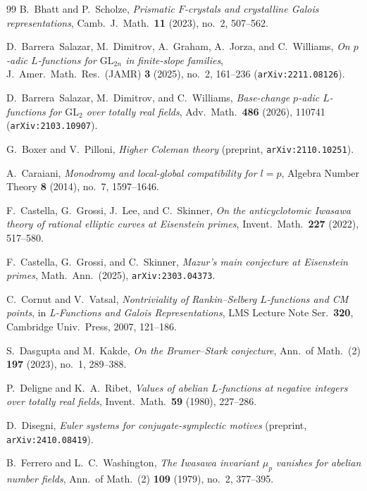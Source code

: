 \begin{thebibliography}{99}
B.~Bhatt and P.~Scholze,
\emph{Prismatic $F$-crystals and crystalline Galois representations},
Camb.\ J.\ Math.\ \textbf{11} (2023), no.~2, 507--562.

D.~Barrera~Salazar, M.~Dimitrov, A.~Graham, A.~Jorza, and C.~Williams,
\emph{On $p$-adic $L$-functions for $\mathrm{GL}_{2n}$ in finite-slope families},
J.\ Amer.\ Math.\ Res.\ (JAMR) \textbf{3} (2025), no.~2, 161--236 (\texttt{arXiv:2211.08126}).

D.~Barrera~Salazar, M.~Dimitrov, and C.~Williams,
\emph{Base-change $p$-adic $L$-functions for $\mathrm{GL}_2$ over totally real fields},
Adv.\ Math.\ \textbf{486} (2026), 110741 (\texttt{arXiv:2103.10907}).

G.~Boxer and V.~Pilloni,
\emph{Higher Coleman theory} (preprint, \texttt{arXiv:2110.10251}).

A.~Caraiani,
\emph{Monodromy and local-global compatibility for $l=p$},
Algebra Number Theory \textbf{8} (2014), no.~7, 1597--1646.

F.~Castella, G.~Grossi, J.~Lee, and C.~Skinner,
\emph{On the anticyclotomic Iwasawa theory of rational elliptic curves at Eisenstein primes},
Invent.\ Math.\ \textbf{227} (2022), 517--580.

F.~Castella, G.~Grossi, and C.~Skinner,
\emph{Mazur's main conjecture at Eisenstein primes},
Math.\ Ann.\ (2025), \texttt{arXiv:2303.04373}.

C.~Cornut and V.~Vatsal,
\emph{Nontriviality of Rankin--Selberg $L$-functions and CM points},
in \emph{L-Functions and Galois Representations}, LMS Lecture Note Ser.\ \textbf{320}, Cambridge Univ.\ Press, 2007, 121--186.

S.~Dasgupta and M.~Kakde,
\emph{On the Brumer--Stark conjecture},
Ann.\ of Math.\ (2) \textbf{197} (2023), no.~1, 289--388.

P.~Deligne and K.~A.~Ribet,
\emph{Values of abelian $L$-functions at negative integers over totally real fields},
Invent.\ Math.\ \textbf{59} (1980), 227--286.

D.~Disegni,
\emph{Euler systems for conjugate-symplectic motives} (preprint, \texttt{arXiv:2410.08419}).

B.~Ferrero and L.~C.~Washington,
\emph{The Iwasawa invariant $\mu_p$ vanishes for abelian number fields},
Ann.\ of Math.\ (2) \textbf{109} (1979), no.~2, 377--395.


\end{thebibliography}
